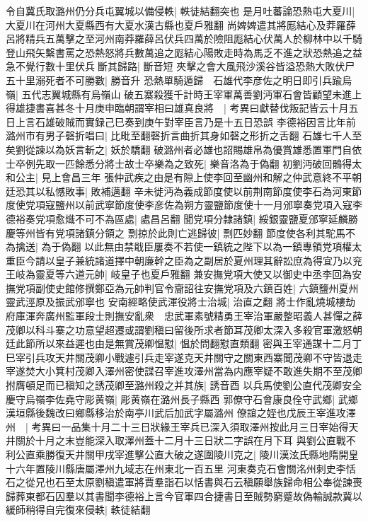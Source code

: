 令自冀氏取潞州仍分兵屯翼城以備侵軼|{
	軼徒結翻突也}
是月吐蕃論恐熱屯大夏川|{
	大夏川在河州大夏縣西有大夏水漢古縣也夏戶雅翻}
尚婢婢遣其將厖結心及莽羅薛呂將精兵五萬擊之至河州南莽羅薛呂伏兵四萬於險阻厖結心伏萬人於柳林中以千騎登山飛矢繫書罵之恐熱怒將兵數萬追之厖結心陽敗走時為馬乏不進之狀恐熱追之益急不覺行數十里伏兵斷其歸路|{
	斷音短}
夾擊之會大風飛沙溪谷皆溢恐熱大敗伏尸五十里溺死者不可勝數|{
	勝音升}
恐熱單騎遁歸　石雄代李彦佐之明日即引兵踰烏嶺|{
	五代志翼城縣有烏嶺山}
破五寨殺獲千計時王宰軍萬善劉沔軍石會皆顧望未進上得雄捷書喜甚冬十月庚申臨朝謂宰相曰雄真良將　|{
	考異曰獻替伐叛記皆云十月五日上言石雄破賊而實録己巳奏到庚午對宰臣言乃是十五日恐誤}
李德裕因言比年前潞州市有男子磬折唱曰|{
	比毗至翻磬折言曲折其身如磬之形折之舌翻}
石雄七千人至矣劉從諫以為妖言斬之|{
	妖於驕翻}
破潞州者必雄也詔賜雄帛為優賞雄悉置軍門自依士卒例先取一匹餘悉分將士故士卒樂為之致死|{
	樂音洛為于偽翻}
初劉沔破回鶻得太和公主|{
	見上會昌三年}
張仲武疾之由是有隙上使李回至幽州和解之仲武意終不平朝廷恐其以私憾敗事|{
	敗補邁翻}
辛未徙沔為義成節度使以前荆南節度使李石為河東節度使党項寇鹽州以前武寧節度使李彦佐為朔方靈鹽節度使十一月邠寧奏党項入寇李德裕奏党項愈熾不可不為區處|{
	處昌呂翻}
聞党項分隸諸鎮|{
	綏銀靈鹽夏邠寧延麟勝慶等州皆有党項諸鎮分領之}
剽掠於此則亡逃歸彼|{
	剽匹妙翻}
節度使各利其駝馬不為擒送|{
	為于偽翻}
以此無由禁戢臣屢奏不若使一鎮統之陛下以為一鎮專領党項權太重臣今請以皇子兼統諸道擇中朝廉幹之臣為之副居於夏州理其辭訟庶為得宜乃以兖王岐為靈夏等六道元帥|{
	岐皇子也夏戶雅翻}
兼安撫党項大使又以御史中丞李回為安撫党項副使史館修撰鄭亞為元帥判官令齎詔往安撫党項及六鎮百姓|{
	六鎮鹽州夏州靈武涇原及振武邠寧也}
安南經略使武渾役將士治城|{
	治直之翻}
將士作亂燒城樓劫府庫渾奔廣州監軍段士則撫安亂衆　忠武軍素號精勇王宰治軍嚴整昭義人甚憚之薛茂卿以科斗寨之功意望超遷或謂劉稹曰留後所求者節耳茂卿太深入多殺官軍激怒朝廷此節所以來益遲也由是無賞茂卿愠懟|{
	愠於問翻懟直類翻}
密與王宰通謀十二月丁巳宰引兵攻天井關茂卿小戰遽引兵走宰遂克天井關守之關東西寨聞茂卿不守皆退走宰遂焚大小箕村茂卿入澤州密使諜召宰進攻澤州當為内應宰疑不敢進失期不至茂卿拊膺頓足而已稹知之誘茂卿至潞州殺之并其族|{
	誘音酉}
以兵馬使劉公直代茂卿安全慶守烏嶺李佐堯守彫黄嶺|{
	彫黄嶺在潞州長子縣西}
郭僚守石會康良佺守武鄉|{
	武鄉漢垣縣後魏改曰鄉縣移治於南亭川武后加武字屬潞州}
僚誼之姪也戊辰王宰進攻澤州　|{
	考異曰一品集十月二十三日狀緣王宰兵已深入須取澤州按此月三日宰始得天井關於十月之末豈能深入取澤州蓋十二月十三日狀二字誤在月下耳}
與劉公直戰不利公直乘勝復天井關甲戌宰進擊公直大破之遂圍陵川克之|{
	陵川漢泫氏縣地隋開皇十六年置陵川縣唐屬澤州九域志在州東北一百五里}
河東奏克石會關洺州刺史李恬石之從兄也石至太原劉稹遣軍將賈羣詣石以恬書與石云稹願舉族歸命相公奉從諫喪歸葬東都石囚羣以其書聞李德裕上言今官軍四合捷書日至賊勢窮蹙故偽輸誠款冀以緩師稍得自完復來侵軼|{
	軼徒結翻}
